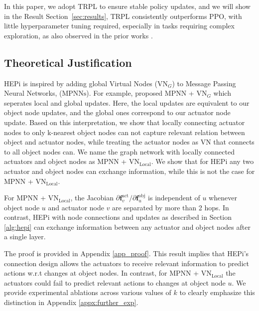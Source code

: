 In this paper, we adopt TRPL to ensure stable policy updates, and we will show in the Result Section~\ref{sec:results}, TRPL consistently outperforms PPO, with little hyperparameter tuning required, especially in tasks requiring complex exploration, as also observed in the prior works \citep{otto23bbrl, li2023open, celik2024acquiring}.



\subsection{Theoretical Justification}
\label{sec:main_theorem}

HEPi is inspired by adding global Virtual Nodes ($\text{VN}_G $) to Message Passing Neural Networks, ($\text{MPNNs}$). 
For example, \citet{southern2024understanding} proposed $\text{MPNN}$ + $\text{VN}_G$ which seperates local and global updates. 
Here, the local updates are equivalent to our object node updates, and the global ones correspond to our actuator node update. Based on this interpretation, we show that locally connecting actuator nodes to only k-nearest object nodes can not capture relevant relation between object and actuator nodes, while treating the actuator nodes as VN that connects to all object nodes can. We name the graph network with locally connected actuators and object nodes as $\text{MPNN}$ + $\text{VN}_{\text {Local}} $. We show that for HEPi any two actuator and object nodes can exchange information, while this is not the case for $\text{MPNN}$ + $\text{VN}_{\text {Local}} $. 

\begin{proposition}
    For $\text{MPNN}$ + $\text{VN}_{\text {Local}} $, the Jacobian $\partial \mathbf{f}_v^{\text{act}}/\partial \mathbf{f}_u^{\text{obj}}$ is independent of $u$ whenever object node $u$ and actuator node $v$ are separated by more than 2 hops. In contrast, HEPi with node connections and updates as described in Section \ref{alg:hepi} can exchange information between any actuator and object nodes after a single layer.
\end{proposition}
The proof is provided in Appendix \ref{app_proof}. This result implies that HEPi's connection design allows the actuators to receive relevant information to predict actions w.r.t changes at object nodes. In contrast, for $\text{MPNN}$ + $\text{VN}_{\text {Local}} $ the actuators could fail to predict relevant actions to changes at object node $u$. We provide experimental ablations across various values of $k$ to clearly emphasize this distinction in Appendix \ref{appx:further_exp}.